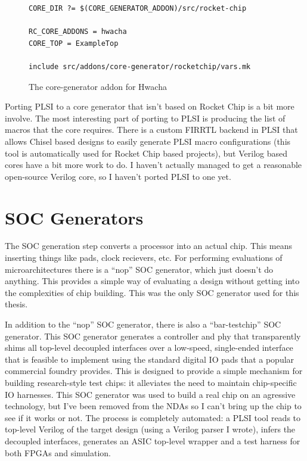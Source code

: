 \documentclass{article}
\begin{document}
\begin{figure}
\begin{verbatim}
CORE_DIR ?= $(CORE_GENERATOR_ADDON)/src/rocket-chip

RC_CORE_ADDONS = hwacha
CORE_TOP = ExampleTop

include src/addons/core-generator/rocketchip/vars.mk
\end{verbatim}
\caption{The core-generator addon for Hwacha}
\label{impl:hwacha-coregen}
\end{figure}

Porting PLSI to a core generator that isn't based on Rocket Chip is a bit more
involve.  The most interesting part of porting to PLSI is producing the list of
macros that the core requires.  There is a custom FIRRTL backend in PLSI that
allows Chisel based designs to easily generate PLSI macro configurations (this
tool is automatically used for Rocket Chip based projects), but Verilog based
cores have a bit more work to do.  I haven't actually managed to get a
reasonable open-source Verilog core, so I haven't ported PLSI to one yet.

\section{SOC Generators}

The SOC generation step converts a processor into an actual chip.  This means
inserting things like pads, clock recievers, etc.  For performing evaluations
of microarchitectures there is a ``nop'' SOC generator, which just doesn't do
anything.  This provides a simple way of evaluating a design without getting
into the complexities of chip building.  This was the only SOC generator used
for this thesis.

In addition to the ``nop'' SOC generator, there is also a ``bar-testchip'' SOC
generator.  This SOC generator generates a controller and phy that
transparently shims all top-level decoupled interfaces over a low-speed,
single-ended interface that is feasible to implement using the standard digital
IO pads that a popular commercial foundry provides.  This is designed to
provide a simple mechanism for building research-style test chips: it
alleviates the need to maintain chip-specific IO harnesses.  This SOC generator
was used to build a real chip on an agressive technology, but I've been removed
from the NDAs so I can't bring up the chip to see if it works or not.  The
process is completely automated: a PLSI tool reads to top-level Verilog of the
target design (using a Verilog parser I wrote), infers the decoupled
interfaces, generates an ASIC top-level wrapper and a test harness for both
FPGAs and simulation.
\end{document}
